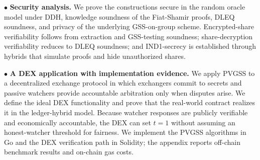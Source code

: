 \documentclass[runningheads]{llncs}
\begin{document}
$\bullet$ \textbf{Security analysis.}
We prove the constructions secure in the random oracle model under DDH, knowledge soundness of the Fiat-Shamir proofs, DLEQ soundness, and privacy of the underlying GSS-on-group scheme. Encrypted-share verifiability follows from extraction and GSS-testing soundness; share-decryption verifiability reduces to DLEQ soundness; and IND1-secrecy is established through hybrids that simulate proofs and hide unauthorized shares.

$\bullet$ \textbf{A DEX application with implementation evidence.}
We apply PVGSS to a decentralized exchange protocol in which exchangers commit to secrets and passive watchers provide accountable arbitration only when disputes arise. We define the ideal DEX functionality and prove that the real-world contract realizes it in the ledger-hybrid model. Because watcher responses are publicly verifiable and economically accountable, the DEX can set \(t=1\) without assuming an honest-watcher threshold for fairness. We implement the PVGSS algorithms in Go and the DEX verification path in Solidity; the appendix reports off-chain benchmark results and on-chain gas costs.





\end{document}
